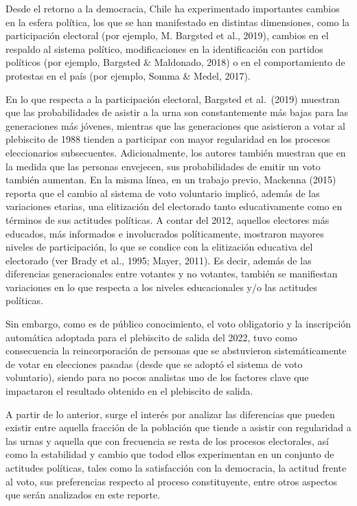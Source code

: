 \documentclass[
  12pt,
]{book}
\begin{document}
Desde el retorno a la democracia, Chile ha experimentado importantes cambios en la esfera política, los que se han manifestado en distintas dimensiones, como la participación electoral (por ejemplo, M. Bargsted et al., 2019), cambios en el respaldo al sistema político, modificaciones en la identificación con partidos políticos (por ejemplo, Bargsted \& Maldonado, 2018) o en el comportamiento de protestas en el país (por ejemplo, Somma \& Medel, 2017).

En lo que respecta a la participación electoral, Bargsted et al.~(2019) muestran que las probabilidades de asistir a la urna son constantemente más bajas para las generaciones más jóvenes, mientras que las generaciones que asistieron a votar al plebiscito de 1988 tienden a participar con mayor regularidad en los procesos eleccionarios subsecuentes. Adicionalmente, los autores también muestran que en la medida que las personas envejecen, sus probabilidades de emitir un voto también aumentan. En la misma línea, en un trabajo previo, Mackenna (2015) reporta que el cambio al sistema de voto voluntario implicó, además de las variaciones etarias, una elitización del electorado tanto educativamente como en términos de sus actitudes políticas. A contar del 2012, aquellos electores más educados, más informados e involucrados políticamente, mostraron mayores niveles de participación, lo que se condice con la elitización educativa del electorado (ver Brady et al., 1995; Mayer, 2011). Es decir, además de las diferencias generacionales entre votantes y no votantes, también se manifiestan variaciones en lo que respecta a los niveles educacionales y/o las actitudes políticas.

Sin embargo, como es de público conocimiento, el voto obligatorio y la inscripción automática adoptada para el plebiscito de salida del 2022, tuvo como consecuencia la reincorporación de personas que se abstuvieron sistemáticamente de votar en elecciones pasadas (desde que se adoptó el sistema de voto voluntario), siendo para no pocos analistas uno de los factores clave que impactaron el resultado obtenido en el plebiscito de salida.

A partir de lo anterior, surge el interés por analizar las diferencias que pueden existir entre aquella fracción de la población que tiende a asistir con regularidad a las urnas y aquella que con frecuencia se resta de los procesos electorales, así como la estabilidad y cambio que todod ellos experimentan en un conjunto de actitudes políticas, tales como la satisfacción con la democracia, la actitud frente al voto, sus preferencias respecto al proceso constituyente, entre otros aspectos que serán analizados en este reporte.
\end{document}
